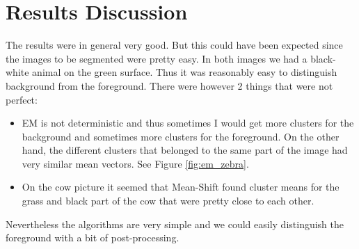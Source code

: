 \documentclass[paper=a4, fontsize=11pt]{scrartcl} %
\numberwithin{equation}{section} %
\numberwithin{figure}{section} %
\numberwithin{table}{section} %
\begin{document}
\section{Results Discussion}

The results were in general very good. But this could have been expected since the images to be segmented were pretty easy. In both images we had a black-white animal on the green surface. Thus it was reasonably easy to distinguish background from the foreground. There were however 2 things that were not perfect:
\begin{itemize}
\item EM is not deterministic and thus sometimes I would get more clusters for the background and sometimes more clusters for the foreground. On the other hand, the different clusters that belonged to the same part of the image had very similar mean vectors. See Figure \ref{fig:em_zebra}.
\item On the cow picture it seemed that Mean-Shift found cluster means for the grass and black part of the cow that were pretty close to each other.
\end{itemize}

Nevertheless the algorithms are very simple and we could easily distinguish the foreground with a bit of post-processing. 
\end{document}
